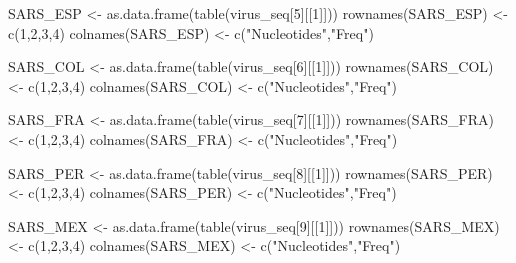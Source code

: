 \documentclass[
]{article}
\newenvironment{Shaded}{\begin{snugshade}}{\end{snugshade}}
\newcommand{\DecValTok}[1]{\textcolor[rgb]{0.00,0.00,0.81}{#1}}
\newcommand{\FunctionTok}[1]{\textcolor[rgb]{0.00,0.00,0.00}{#1}}
\newcommand{\NormalTok}[1]{#1}
\newcommand{\OtherTok}[1]{\textcolor[rgb]{0.56,0.35,0.01}{#1}}
\newcommand{\StringTok}[1]{\textcolor[rgb]{0.31,0.60,0.02}{#1}}
\begin{document}
\begin{Shaded}
\begin{Highlighting}[]
\NormalTok{SARS\_ESP }\OtherTok{\textless{}{-}} \FunctionTok{as.data.frame}\NormalTok{(}\FunctionTok{table}\NormalTok{(virus\_seq[}\DecValTok{5}\NormalTok{][[}\DecValTok{1}\NormalTok{]]))}
\FunctionTok{rownames}\NormalTok{(SARS\_ESP) }\OtherTok{\textless{}{-}} \FunctionTok{c}\NormalTok{(}\DecValTok{1}\NormalTok{,}\DecValTok{2}\NormalTok{,}\DecValTok{3}\NormalTok{,}\DecValTok{4}\NormalTok{)}
\FunctionTok{colnames}\NormalTok{(SARS\_ESP) }\OtherTok{\textless{}{-}} \FunctionTok{c}\NormalTok{(}\StringTok{"Nucleotides"}\NormalTok{,}\StringTok{"Freq"}\NormalTok{)}

\NormalTok{SARS\_COL }\OtherTok{\textless{}{-}} \FunctionTok{as.data.frame}\NormalTok{(}\FunctionTok{table}\NormalTok{(virus\_seq[}\DecValTok{6}\NormalTok{][[}\DecValTok{1}\NormalTok{]]))}
\FunctionTok{rownames}\NormalTok{(SARS\_COL) }\OtherTok{\textless{}{-}} \FunctionTok{c}\NormalTok{(}\DecValTok{1}\NormalTok{,}\DecValTok{2}\NormalTok{,}\DecValTok{3}\NormalTok{,}\DecValTok{4}\NormalTok{)}
\FunctionTok{colnames}\NormalTok{(SARS\_COL) }\OtherTok{\textless{}{-}} \FunctionTok{c}\NormalTok{(}\StringTok{"Nucleotides"}\NormalTok{,}\StringTok{"Freq"}\NormalTok{)}

\NormalTok{SARS\_FRA }\OtherTok{\textless{}{-}} \FunctionTok{as.data.frame}\NormalTok{(}\FunctionTok{table}\NormalTok{(virus\_seq[}\DecValTok{7}\NormalTok{][[}\DecValTok{1}\NormalTok{]]))}
\FunctionTok{rownames}\NormalTok{(SARS\_FRA) }\OtherTok{\textless{}{-}} \FunctionTok{c}\NormalTok{(}\DecValTok{1}\NormalTok{,}\DecValTok{2}\NormalTok{,}\DecValTok{3}\NormalTok{,}\DecValTok{4}\NormalTok{)}
\FunctionTok{colnames}\NormalTok{(SARS\_FRA) }\OtherTok{\textless{}{-}} \FunctionTok{c}\NormalTok{(}\StringTok{"Nucleotides"}\NormalTok{,}\StringTok{"Freq"}\NormalTok{)}

\NormalTok{SARS\_PER }\OtherTok{\textless{}{-}} \FunctionTok{as.data.frame}\NormalTok{(}\FunctionTok{table}\NormalTok{(virus\_seq[}\DecValTok{8}\NormalTok{][[}\DecValTok{1}\NormalTok{]]))}
\FunctionTok{rownames}\NormalTok{(SARS\_PER) }\OtherTok{\textless{}{-}} \FunctionTok{c}\NormalTok{(}\DecValTok{1}\NormalTok{,}\DecValTok{2}\NormalTok{,}\DecValTok{3}\NormalTok{,}\DecValTok{4}\NormalTok{)}
\FunctionTok{colnames}\NormalTok{(SARS\_PER) }\OtherTok{\textless{}{-}} \FunctionTok{c}\NormalTok{(}\StringTok{"Nucleotides"}\NormalTok{,}\StringTok{"Freq"}\NormalTok{)}

\NormalTok{SARS\_MEX }\OtherTok{\textless{}{-}} \FunctionTok{as.data.frame}\NormalTok{(}\FunctionTok{table}\NormalTok{(virus\_seq[}\DecValTok{9}\NormalTok{][[}\DecValTok{1}\NormalTok{]]))}
\FunctionTok{rownames}\NormalTok{(SARS\_MEX) }\OtherTok{\textless{}{-}} \FunctionTok{c}\NormalTok{(}\DecValTok{1}\NormalTok{,}\DecValTok{2}\NormalTok{,}\DecValTok{3}\NormalTok{,}\DecValTok{4}\NormalTok{)}
\FunctionTok{colnames}\NormalTok{(SARS\_MEX) }\OtherTok{\textless{}{-}} \FunctionTok{c}\NormalTok{(}\StringTok{"Nucleotides"}\NormalTok{,}\StringTok{"Freq"}\NormalTok{)}


\end{Highlighting}
\end{Shaded}
\end{document}
